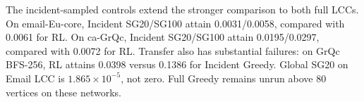 The incident-sampled controls extend the stronger comparison to both full LCCs. On email-Eu-core, Incident SG20/SG100 attain 0.0031/0.0058, compared with 0.0061 for RL. On ca-GrQc, Incident SG20/SG100 attain 0.0195/0.0297, compared with 0.0072 for RL. Transfer also has substantial failures: on GrQc BFS-256, RL attains 0.0398 versus 0.1386 for Incident Greedy. Global SG20 on Email LCC is $1.865\times10^{-5}$, not zero. Full Greedy remains unrun above 80 vertices on these networks.
